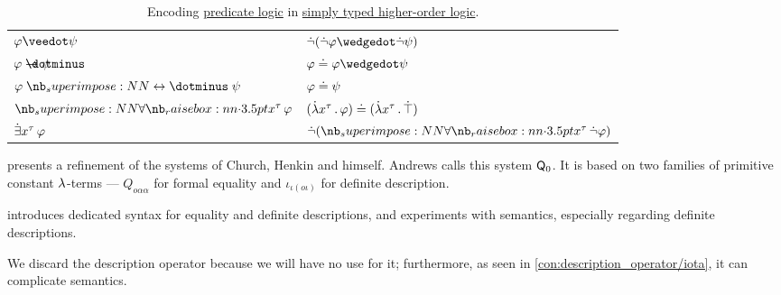 \begin{remark}
\begin{thmenum}
\begin{table}
\begin{center}
\begin{tabular}{l l}
          \( \varphi \synvee \psi \)       & \( \synneg (\synneg \varphi \synwedge \synneg \psi) \)                                                                                                                                                   \\
          \( \varphi \synimplies \psi \)   & \( \varphi \syneq \varphi \synwedge \psi \)                                                                                                                                                              \\
          \( \varphi \syniff \psi \)       & \( \varphi \doteq \psi \)                                                                                                                                                                                \\
          \( \qforall {x^\tau} \varphi \)  & \( (\qabs {x^\tau} \varphi) \syneq (\qabs {x^\tau} \syntop) \)                                                                                                                                           \\
          \( \qexists {x^\tau} \varphi \)  & \( \synneg (\qforall {x^\tau} \synneg \varphi) \)                                                                                                                                                        \\
          \bottomrule
        \end{tabular}
      \end{center}

      \caption{Encoding \hyperref[rem:predicate_logic]{predicate logic} in \hyperref[def:simply_typed_hol]{simply typed higher-order logic}.}\label{tab:rem:simply_typed_hol/abbreviation}
    \end{table}

     presents a refinement of the systems of Church, Henkin and himself. Andrews calls this system \( \textsf{\upshape Q}_0 \). It is based on two families of primitive constant \( {\mathrm \lambda} \)-terms --- \( Q_{o \alpha \alpha} \) for formal equality and \( \iota_{\iota (o \iota)} \) for definite description.

     introduces dedicated syntax for equality and definite descriptions, and experiments with semantics, especially regarding definite descriptions.

    We discard the description operator because we will have no use for it; furthermore, as seen in \cref{con:description_operator/iota}, it can complicate semantics.


\end{thmenum}
\end{remark}
